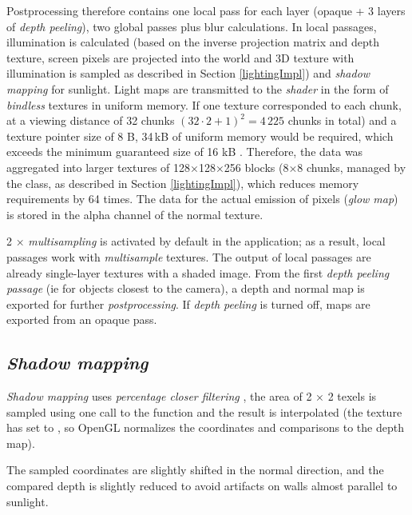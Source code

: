 Postprocessing therefore contains one local pass for each layer (opaque + 3 layers of \textit{depth peeling}), two global passes plus blur calculations. In local passages, illumination is calculated (based on the inverse projection matrix and depth texture, screen pixels are projected into the world and 3D texture with illumination is sampled as described in Section \ref{lightingImpl}) and \textit{shadow mapping} for sunlight. Light maps are transmitted to the \textit{shader} in the form of \textit{bindless} textures in uniform memory. If one texture corresponded to each chunk, at a viewing distance of 32 chunks $(32 \cdot 2 + 1)^2 = 4\,225$ chunks in total) and a texture pointer size of 8 B, 34\,kB of uniform memory would be required, which exceeds the minimum guaranteed size of 16 kB . Therefore, the data was aggregated into larger textures of 128×128×256 blocks (8×8 chunks, managed by the  class, as described in Section \ref{lightingImpl}), which reduces memory requirements by 64 times. The data for the actual emission of pixels (\textit{glow map}) is stored in the alpha channel of the normal texture.

2 × \textit{multisampling} is activated by default in the application; as a result, local passages work with \textit{multisample} textures. The output of local passages are already single-layer textures with a shaded image. From the first \textit{depth peeling passage} (ie for objects closest to the camera), a depth and normal map is exported for further \textit{postprocessing}. If \textit{depth peeling} is turned off, maps are exported from an opaque pass.

\pagebreak
\subsection{\textit{Shadow mapping}}
\textit{Shadow mapping} uses \textit{percentage closer filtering} \cite{ReevesWilliamT.1987Rasw}, the area of 2 × 2 texels is sampled using one call to the  function and the result is interpolated (the texture has  set to , so OpenGL normalizes the coordinates and comparisons to the depth map).


The sampled coordinates are slightly shifted in the normal direction, and the compared depth is slightly reduced to avoid artifacts on walls almost parallel to sunlight.

